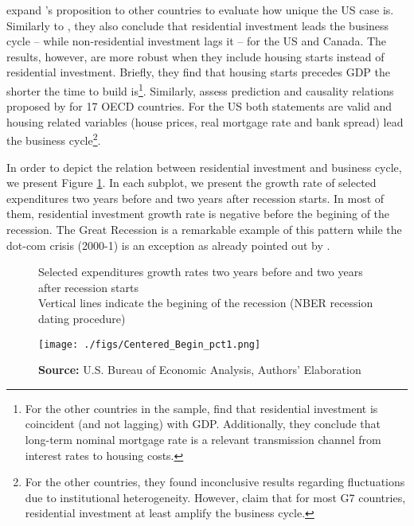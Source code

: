 \documentclass[12pt, a4paper]{article}
\begin{document}
\textcite{kydland_2016_housing} expand \citeauthor*{leamer_housing_2007}'s \citeyear{leamer_housing_2007} proposition to other countries to evaluate how unique the US case is.
Similarly to \textcite{green_follow_1997}, they also conclude that residential investment leads the business cycle -- while non-residential investment lags it -- for the US and Canada.
The results, however, are more robust when they include housing starts instead of residential investment.
Briefly, they find that housing starts precedes GDP the shorter the time to build is\footnote{For the other countries in the sample, \textcite{kydland_2016_housing} find that residential investment is coincident (and not lagging) with GDP. Additionally, they conclude that long-term nominal mortgage rate is a relevant transmission channel from interest rates to housing costs.}.
Similarly, \textcite{huang_is_2018} assess  prediction and causality relations proposed by \textcite{leamer_housing_2007} for 17 OECD countries.
For the US both statements are valid and housing related variables (house prices, real mortgage rate and bank spread) lead the business cycle\footnote{For the other countries, they found inconclusive results regarding fluctuations due to institutional heterogeneity. However, \textcite{huang_is_2018} claim that for most G7 countries, residential investment at least amplify the business cycle.}.


In order to depict the relation between residential investment and business cycle, we present Figure \ref{fig:cycle}.
In each subplot, we present the growth rate of selected expenditures two years before and two years after recession starts.
In most of them, residential investment growth rate is negative before the begining of the recession.
The Great Recession is a remarkable example of this pattern while the dot-com crisis (2000-1) is an exception as already pointed out by \textcite{leamer_housing_2007}.


\begin{figure}[H]
	\centering
	\caption{Selected expenditures growth rates two years before and two years after recession starts\\Vertical lines indicate the begining of the recession (NBER recession dating procedure)}
	\label{fig:cycle}
	\texttt{[image: ./figs/Centered\_Begin\_pct1.png]}
	\caption*{\textbf{Source:} U.S. Bureau of Economic Analysis, Authors' Elaboration}
\end{figure}
\end{document}
